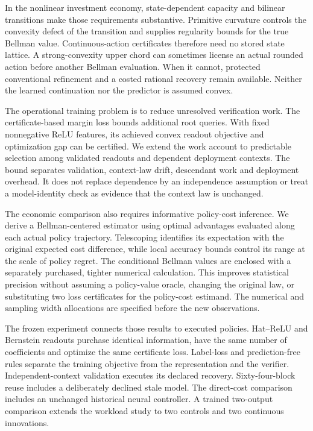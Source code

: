 \documentclass[ecta,nameyear,draft]{econsocart}
\begin{document}
In the nonlinear investment economy, state-dependent capacity and bilinear transitions make those requirements substantive. Primitive curvature controls the convexity defect of the transition and supplies regularity bounds for the true Bellman value. Continuous-action certificates therefore need no stored state lattice. A strong-convexity upper chord can sometimes license an actual rounded action before another Bellman evaluation. When it cannot, protected conventional refinement and a costed rational recovery remain available. Neither the learned continuation nor the predictor is assumed convex.

The operational training problem is to reduce unresolved verification work. The certificate-based margin loss bounds additional root queries. With fixed nonnegative ReLU features, its achieved convex readout objective and optimization gap can be certified. We extend the work account to predictable selection among validated readouts and dependent deployment contexts. The bound separates validation, context-law drift, descendant work and deployment overhead. It does not replace dependence by an independence assumption or treat a model-identity check as evidence that the context law is unchanged.

The economic comparison also requires informative policy-cost inference. We derive a Bellman-centered estimator using optimal advantages evaluated along each actual policy trajectory. Telescoping identifies its expectation with the original expected cost difference, while local accuracy bounds control its range at the scale of policy regret. The conditional Bellman values are enclosed with a separately purchased, tighter numerical calculation. This improves statistical precision without assuming a policy-value oracle, changing the original law, or substituting two loss certificates for the policy-cost estimand. The numerical and sampling width allocations are specified before the new observations.

The frozen experiment connects those results to executed policies. Hat--ReLU and Bernstein readouts purchase identical information, have the same number of coefficients and optimize the same certificate loss. Label-loss and prediction-free rules separate the training objective from the representation and the verifier. Independent-context validation executes its declared recovery. Sixty-four-block reuse includes a deliberately declined stale model. The direct-cost comparison includes an unchanged historical neural controller. A trained two-output comparison extends the workload study to two controls and two continuous innovations.
\end{document}
